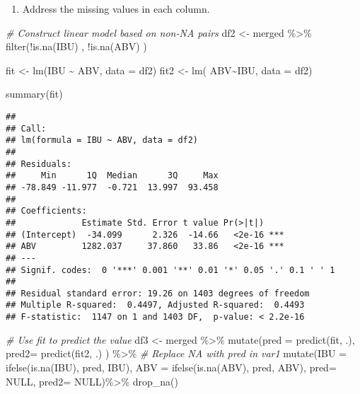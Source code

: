 \documentclass[
]{article}
\newenvironment{Shaded}{\begin{snugshade}}{\end{snugshade}}
\newcommand{\AttributeTok}[1]{\textcolor[rgb]{0.77,0.63,0.00}{#1}}
\newcommand{\CommentTok}[1]{\textcolor[rgb]{0.56,0.35,0.01}{\textit{#1}}}
\newcommand{\ConstantTok}[1]{\textcolor[rgb]{0.00,0.00,0.00}{#1}}
\newcommand{\FunctionTok}[1]{\textcolor[rgb]{0.00,0.00,0.00}{#1}}
\newcommand{\NormalTok}[1]{#1}
\newcommand{\OtherTok}[1]{\textcolor[rgb]{0.56,0.35,0.01}{#1}}
\newcommand{\SpecialCharTok}[1]{\textcolor[rgb]{0.00,0.00,0.00}{#1}}
\providecommand{\tightlist}{%
  \setlength{\itemsep}{0pt}\setlength{\parskip}{0pt}}
\begin{document}
\begin{enumerate}
\def\labelenumi{\arabic{enumi}.}
\setcounter{enumi}{2}
\tightlist
\item
  Address the missing values in each column.
\end{enumerate}

\begin{Shaded}
\begin{Highlighting}[]
\CommentTok{\# Construct linear model based on non{-}NA pairs}
\NormalTok{df2 }\OtherTok{\textless{}{-}}\NormalTok{ merged }\SpecialCharTok{\%\textgreater{}\%} \FunctionTok{filter}\NormalTok{(}\SpecialCharTok{!}\FunctionTok{is.na}\NormalTok{(IBU) , }\SpecialCharTok{!}\FunctionTok{is.na}\NormalTok{(ABV) )}

\NormalTok{fit }\OtherTok{\textless{}{-}} \FunctionTok{lm}\NormalTok{(IBU }\SpecialCharTok{\textasciitilde{}}\NormalTok{ ABV, }\AttributeTok{data =}\NormalTok{ df2)}
\NormalTok{fit2 }\OtherTok{\textless{}{-}} \FunctionTok{lm}\NormalTok{( ABV}\SpecialCharTok{\textasciitilde{}}\NormalTok{IBU, }\AttributeTok{data =}\NormalTok{ df2)}

\FunctionTok{summary}\NormalTok{(fit)}
\end{Highlighting}
\end{Shaded}

\begin{verbatim}
## 
## Call:
## lm(formula = IBU ~ ABV, data = df2)
## 
## Residuals:
##     Min      1Q  Median      3Q     Max 
## -78.849 -11.977  -0.721  13.997  93.458 
## 
## Coefficients:
##             Estimate Std. Error t value Pr(>|t|)    
## (Intercept)  -34.099      2.326  -14.66   <2e-16 ***
## ABV         1282.037     37.860   33.86   <2e-16 ***
## ---
## Signif. codes:  0 '***' 0.001 '**' 0.01 '*' 0.05 '.' 0.1 ' ' 1
## 
## Residual standard error: 19.26 on 1403 degrees of freedom
## Multiple R-squared:  0.4497, Adjusted R-squared:  0.4493 
## F-statistic:  1147 on 1 and 1403 DF,  p-value: < 2.2e-16
\end{verbatim}

\begin{Shaded}
\begin{Highlighting}[]
\CommentTok{\# Use fit to predict the value}
\NormalTok{df3 }\OtherTok{\textless{}{-}}\NormalTok{ merged }\SpecialCharTok{\%\textgreater{}\%} 
  \FunctionTok{mutate}\NormalTok{(}\AttributeTok{pred =} \FunctionTok{predict}\NormalTok{(fit, .),}
         \AttributeTok{pred2=} \FunctionTok{predict}\NormalTok{(fit2, .) ) }\SpecialCharTok{\%\textgreater{}\%}
  \CommentTok{\# Replace NA with pred in var1}
  \FunctionTok{mutate}\NormalTok{(}\AttributeTok{IBU =} \FunctionTok{ifelse}\NormalTok{(}\FunctionTok{is.na}\NormalTok{(IBU), pred, IBU),}
         \AttributeTok{ABV =} \FunctionTok{ifelse}\NormalTok{(}\FunctionTok{is.na}\NormalTok{(ABV), pred, ABV),}
         \AttributeTok{pred=} \ConstantTok{NULL}\NormalTok{,}
         \AttributeTok{pred2=} \ConstantTok{NULL}\NormalTok{)}\SpecialCharTok{\%\textgreater{}\%}
  \FunctionTok{drop\_na}\NormalTok{()}
\end{Highlighting}
\end{Shaded}
\end{document}

